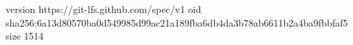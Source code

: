 version https://git-lfs.github.com/spec/v1
oid sha256:6a13d80570ba0d549985d99ac21a189fba6db4da3b78ab6611b2a4ba9fbbfaf5
size 1514
